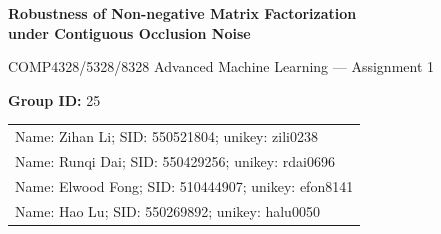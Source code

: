 \documentclass[12pt,a4paper]{article}
\begin{document}
\begin{center}
  {\fontsize{14}{17}\selectfont\bfseries
   Robustness of Non-negative Matrix Factorization\\
   under Contiguous Occlusion Noise\par}
  \vspace{0.6em}
  {\fontsize{12}{14}\selectfont
   COMP4328/5328/8328 Advanced Machine Learning --- Assignment 1\par}
  \vspace{0.8em}
  {\fontsize{12}{14}\selectfont
 \textbf{Group ID:} 25\par}
  \vspace{0.4em}
  {\fontsize{11}{13}\selectfont
   \begin{tabular}{lll}
     \multicolumn{3}{l}{Name: Zihan Li; SID: 550521804; unikey: zili0238} \\
     \multicolumn{3}{l}{Name: Runqi Dai; SID: 550429256; unikey: rdai0696} \\
     \multicolumn{3}{l}{Name: Elwood Fong; SID: 510444907; unikey: efon8141} \\
     \multicolumn{3}{l}{Name: Hao Lu; SID: 550269892; unikey: halu0050} \\
   \end{tabular}\par}
\end{center}
\vspace{0.6em}
\end{document}
